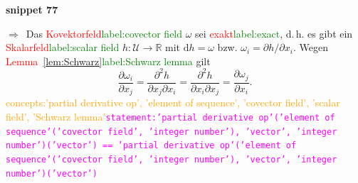 \documentclass[a4paper,twoside,english,ngerman,deutsch,german,sectrefs,envcountsame,envcountchap]{svmono}
\newcommand{\setref}[2]{\textcolor{red}{#1}\textcolor{green}{#2}}
\newcommand{\snippet}[1]{\textbf{snippet #1}\\}
\newcommand{\eqnote}[2]{\textcolor{orange}{#1}\textcolor{magenta}{\texttt{#2}}}
\begin{document}
\snippet{77}
\begin{svmultproof}
\glqq$\Rightarrow$\grqq\ Das \setref{Kovektorfeld}{label:covector field} $\omega$ sei \setref{exakt}{label:exact}, d.\,h. es gibt
ein \setref{Skalarfeld}{label:scalar field} $h:\mathcal{U}\to{\mathbb{R}}$ mit ${\mathrm{d}} h=\omega$ bzw. $\omega_{i}=\partial h/\partial x_{i}$.
Wegen \setref{Lemma~\ref{lem:Schwarz}}{label:Schwarz lemma} gilt
\[
\frac{\partial\omega_{i}}{\partial x_{j}}=\frac{\partial^{2}h}{\partial x_{j}\partial x_{i}}=\frac{\partial^{2}h}{\partial x_{i}\partial x_{j}}=\frac{\partial\omega_{j}}{\partial x_{i}}.
\]\eqnote{concepts:'partial derivative op', 'element of sequence', 'covector field', 'scalar field', 'Schwarz lemma'}{statement:'partial derivative op'('element of sequence'('covector field', 'integer number'), 'vector', 'integer number')('vector') == 'partial derivative op'('element of sequence'('covector field', 'integer number'), 'vector', 'integer number')('vector')}


\end{svmultproof}
\end{document}
